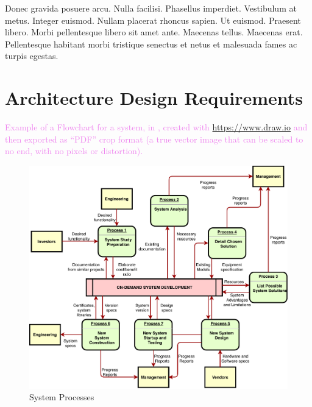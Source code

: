 \cleardoublepage
\label{chap:architecture}

Donec gravida posuere arcu. Nulla facilisi. Phasellus imperdiet. Vestibulum at metus. Integer euismod. Nullam placerat rhoncus sapien. Ut euismod. Praesent libero. Morbi pellentesque libero sit amet ante. Maecenas tellus. Maecenas erat. Pellentesque habitant morbi tristique senectus et netus et malesuada fames ac turpis egestas.
\section{Architecture Design Requirements} 
\textcolor{violet}{Example of a Flowchart for a system, in , created with \url{https://www.draw.io} and then exported as ``PDF'' crop format (a true vector image that can be scaled to no end, with no pixels or distortion).}

\begin{figure}[h]
\centering
\includegraphics[width=1.0\textwidth]{./Images/Flowchart_from_draw-io.pdf}
\caption{System Processes}
\label{fig:flowchart}
\end{figure}

